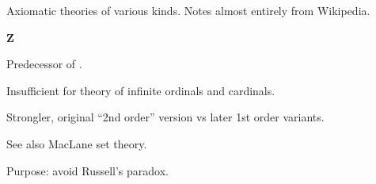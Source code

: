% 


\setcounter{currentlevel}{\value{baseSectionLevel}}

Axiomatic theories of various kinds.
Notes almost entirely from Wikipedia.


\textbf{Z}\cite{wiki:Zermelo_set_theory}

Predecessor of .

Insufficient for theory of infinite 
ordinals\cite{wiki:Ordinal_number}
and cardinals.

Strongler, original ``2nd order'' version 
vs  later 1st order variants.

See also MacLane set theory\cite{maclane:mff:1986}.
\label{sec:Zermelo-Fraenkel-set-theory}

Purpose: avoid Russell's paradox\cite{wiki:Russell-paradox}.


